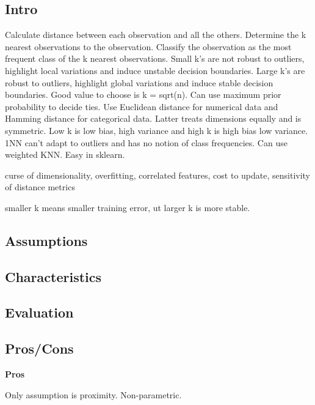 \documentclass[]{book}
\begin{document}
\hypertarget{intro-3}{%
\subsection{Intro}\label{intro-3}}

Calculate distance between each observation and all the others. Determine the k nearest observations to the observation. Classify the observation as the most frequent class of the k nearest observations. Small k's are not robust to outliers, highlight local variations and induce unstable decision boundaries. Large k's are robust to outliers, highlight global variations and induce stable decision boundaries. Good value to choose is k = sqrt(n). Can use maximum prior probability to decide ties. Use Euclidean distance for numerical data and Hamming distance for categorical data. Latter treats dimensions equally and is symmetric. Low k is low bias, high variance and high k is high bias low variance. 1NN can't adapt to outliers and has no notion of class frequencies. Can use weighted KNN. Easy in sklearn.

curse of dimensionality, overfitting, correlated features, cost to update, sensitivity of distance metrics

smaller k means smaller training error, ut larger k is more stable.

\hypertarget{assumptions-3}{%
\subsection{Assumptions}\label{assumptions-3}}

\hypertarget{characteristics-2}{%
\subsection{Characteristics}\label{characteristics-2}}

\hypertarget{evaluation-3}{%
\subsection{Evaluation}\label{evaluation-3}}

\hypertarget{proscons-3}{%
\subsection{Pros/Cons}\label{proscons-3}}

\textbf{Pros}

Only assumption is proximity. Non-parametric.
\end{document}
